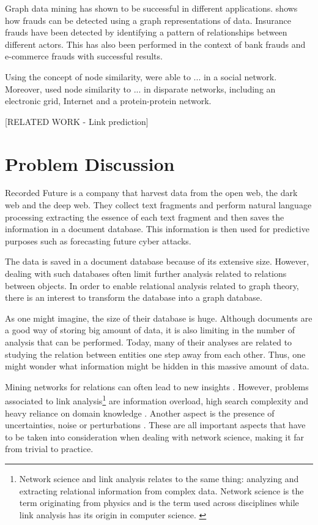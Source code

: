 Graph data mining has shown to be successful in different applications. \citet{bankFraud} shows how frauds can be detected using a graph representations of data. Insurance frauds have been detected by identifying a pattern of relationships between different actors. This has also been performed in the context of bank frauds and e-commerce frauds with successful results. 

Using the concept of node similarity, \citet{} were able to ... in a social network. Moreover, \citet{} used node similarity to ... in disparate networks, including an electronic grid, Internet and a protein-protein network.

[RELATED WORK - Link prediction]


\section{Problem Discussion}
Recorded Future is a company that harvest data from the open web, the dark web and the deep web. They collect text fragments and perform natural language processing extracting the essence of each text fragment and then saves the information in a document database. This information is then used for predictive purposes such as forecasting future cyber attacks.

The data is saved in a document database because of its extensive size. However, dealing with such databases often limit further analysis related to relations between objects. In order to enable relational analysis related to graph theory, there is an interest to transform the database into a graph database.

As one might imagine, the size of their database is huge. Although documents are a good way of storing big amount of data, it is also limiting in the number of analysis that can be performed. Today, many of their analyses are related to studying the relation between entities one step away from each other. Thus, one might wonder what information might be hidden in this massive amount of data.

Mining networks for relations can often lead to new insights \cite{hendrix2010}. However, problems associated to link analysis\footnote{Network science and link analysis relates to the same thing: analyzing and extracting relational information from complex data. Network science is the term originating from physics and is the term used across disciplines while link analysis has its origin in computer science. \cite{fouss2016algorithms}} are information overload, high search complexity and heavy reliance on domain knowledge \cite{hendrix2010,schroeder2007}. Another aspect is the presence of uncertainties, noise or perturbations \cite{hendrix2010}. These are all important aspects that have to be taken into consideration when dealing with network science, making it far from trivial to practice. 

